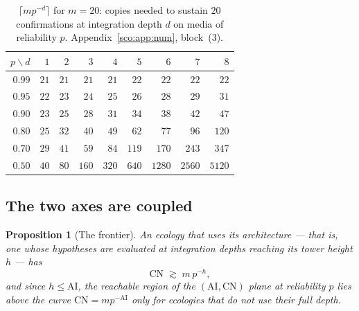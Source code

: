 \documentclass[11pt]{article}
\theoremstyle{plain}
\newtheorem{proposition}[theorem]{Proposition}
\theoremstyle{definition}
\theoremstyle{remark}
\newcommand{\AI}{\mathrm{AI}}
\newcommand{\CN}{\mathrm{CN}}
\begin{document}
\begin{table}[h]
\centering
\begin{tabular}{rrrrrrrrr}
\toprule
$p \backslash d$ & $1$ & $2$ & $3$ & $4$ & $5$ & $6$ & $7$ & $8$ \\
\midrule
$0.99$ & $21$ & $21$ & $21$ & $21$ & $22$ & $22$ & $22$ & $22$ \\
$0.95$ & $22$ & $23$ & $24$ & $25$ & $26$ & $28$ & $29$ & $31$ \\
$0.90$ & $23$ & $25$ & $28$ & $31$ & $34$ & $38$ & $42$ & $47$ \\
$0.80$ & $25$ & $32$ & $40$ & $49$ & $62$ & $77$ & $96$ & $120$ \\
$0.70$ & $29$ & $41$ & $59$ & $84$ & $119$ & $170$ & $243$ & $347$ \\
$0.50$ & $40$ & $80$ & $160$ & $320$ & $640$ & $1280$ & $2560$ & $5120$ \\
\bottomrule
\end{tabular}
\caption{$\lceil m p^{-d}\rceil$ for $m = 20$: copies needed to sustain
$20$ confirmations at integration depth $d$ on media of reliability $p$.
Appendix~\ref{sco:app:num}, block~(3).}
\label{sco:tab:sampling}
\end{table}

\subsection{The two axes are coupled}\label{sco:S7.3}

\begin{proposition}[The frontier]\label{sco:prop:frontier}
An ecology that uses its architecture --- that is, one whose hypotheses
are evaluated at integration depths reaching its tower height $h$ --- has
\[
  \CN \;\gtrsim\; m\, p^{-h},
\]
and since $h \le \AI$, the reachable region of the
$(\AI, \CN)$ plane at reliability $p$ lies above the curve
$\CN = m p^{-\AI}$ only for ecologies that do not use their full depth.
\end{proposition}
\end{document}
